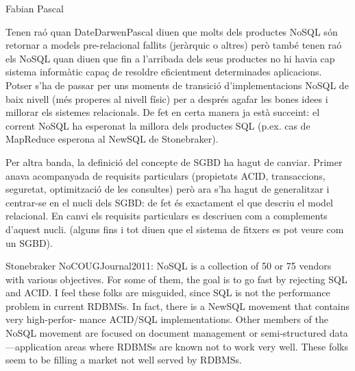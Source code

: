 

Fabian Pascal %





Tenen raó quan DateDarwenPascal diuen que molts dels productes NoSQL són retornar a models pre-relacional fallits (jeràrquic o  altres) però també tenen raó els NoSQL quan diuen que fin a l'arribada dels seus productes no hi havia cap sistema informàtic capaç de resoldre eficientment determinades aplicacions. Potser s'ha de passar per uns moments de transició d'implementacions NoSQL de baix nivell (més properes al nivell físic) per a després agafar les bones idees i millorar els sistemes relacionals. De fet en certa manera ja està succeint: el corrent NoSQL ha esperonat la millora dels productes SQL (p.ex. cas de MapReduce esperona al NewSQL de Stonebraker).

Per altra banda, la definició del concepte de SGBD ha hagut de canviar. Primer anava acompanyada de requisits particulars (propietats ACID, transaccions, seguretat, optimització de les consultes) però ara s'ha hagut de generalitzar i centrar-se en el nucli dels SGBD: de fet és exactament el que descriu el model relacional. En canvi els requisits particulars es descriuen com a complements d'aquest nucli. (alguns fins i tot diuen que el sistema de fitxers es pot veure com un SGBD).


Stonebraker NoCOUGJournal2011:
NoSQL is a collection of 50 or 75 vendors with various
objectives. For some of them, the goal is to go fast by rejecting
SQL and ACID. I feel these folks are misguided, since SQL is
not the performance problem in current RDBMSs. In fact,
there is a NewSQL movement that contains very high-perfor-
mance ACID/SQL implementations.
Other members of the NoSQL movement are focused on
document management or semi-structured data—application
areas where RDBMSs are known not to work very well. These
folks seem to be filling a market not well served by RDBMSs.

